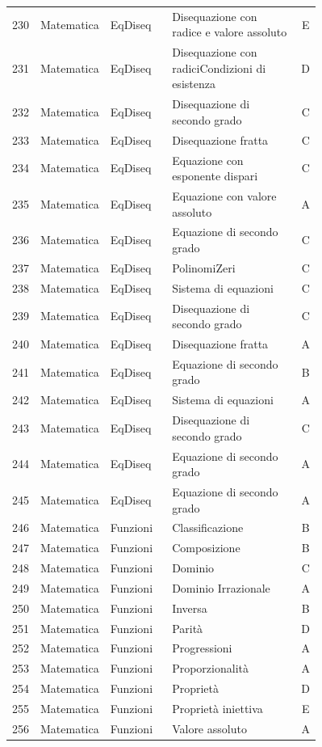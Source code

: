 \documentclass[20pt, a4paper]{article}
\begin{document}
\begin{longtable}{@{}r>{\raggedright\arraybackslash}p{0.14\linewidth}>{\raggedright\arraybackslash}p{0.20\linewidth}>{\raggedright\arraybackslash}p{0.42\linewidth}c@{}}
230 & Matematica & EqDiseq & Disequazione con radice e valore assoluto & E \\
231 & Matematica & EqDiseq & Disequazione con radiciCondizioni di esistenza & D \\
232 & Matematica & EqDiseq & Disequazione di secondo grado & C \\
233 & Matematica & EqDiseq & Disequazione fratta & C \\
234 & Matematica & EqDiseq & Equazione con esponente dispari & C \\
235 & Matematica & EqDiseq & Equazione con valore assoluto & A \\
236 & Matematica & EqDiseq & Equazione di secondo grado & C \\
237 & Matematica & EqDiseq & PolinomiZeri & C \\
238 & Matematica & EqDiseq & Sistema di equazioni & C \\
239 & Matematica & EqDiseq & Disequazione di secondo grado & C \\
240 & Matematica & EqDiseq & Disequazione fratta & A \\
241 & Matematica & EqDiseq & Equazione di secondo grado & B \\
242 & Matematica & EqDiseq & Sistema di equazioni & A \\
243 & Matematica & EqDiseq & Disequazione di secondo grado & C \\
244 & Matematica & EqDiseq & Equazione di secondo grado & A \\
245 & Matematica & EqDiseq & Equazione di secondo grado & A \\
246 & Matematica & Funzioni & Classificazione & B \\
247 & Matematica & Funzioni & Composizione & B \\
248 & Matematica & Funzioni & Dominio & C \\
249 & Matematica & Funzioni & Dominio Irrazionale & A \\
250 & Matematica & Funzioni & Inversa & B \\
251 & Matematica & Funzioni & Parità & D \\
252 & Matematica & Funzioni & Progressioni & A \\
253 & Matematica & Funzioni & Proporzionalità & A \\
254 & Matematica & Funzioni & Proprietà & D \\
255 & Matematica & Funzioni & Proprietà iniettiva & E \\
256 & Matematica & Funzioni & Valore assoluto & A \\

\end{longtable}
\end{document}
